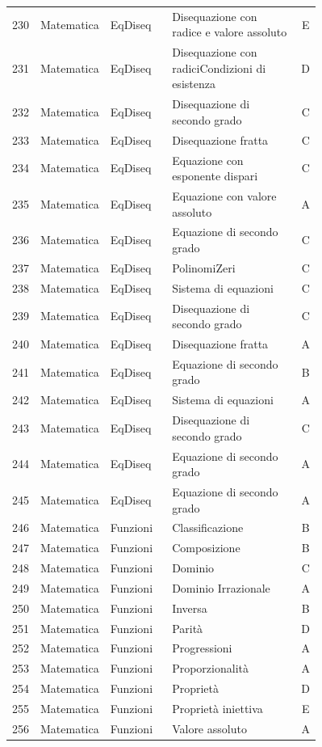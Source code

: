 \documentclass[20pt, a4paper]{article}
\begin{document}
\begin{longtable}{@{}r>{\raggedright\arraybackslash}p{0.14\linewidth}>{\raggedright\arraybackslash}p{0.20\linewidth}>{\raggedright\arraybackslash}p{0.42\linewidth}c@{}}
230 & Matematica & EqDiseq & Disequazione con radice e valore assoluto & E \\
231 & Matematica & EqDiseq & Disequazione con radiciCondizioni di esistenza & D \\
232 & Matematica & EqDiseq & Disequazione di secondo grado & C \\
233 & Matematica & EqDiseq & Disequazione fratta & C \\
234 & Matematica & EqDiseq & Equazione con esponente dispari & C \\
235 & Matematica & EqDiseq & Equazione con valore assoluto & A \\
236 & Matematica & EqDiseq & Equazione di secondo grado & C \\
237 & Matematica & EqDiseq & PolinomiZeri & C \\
238 & Matematica & EqDiseq & Sistema di equazioni & C \\
239 & Matematica & EqDiseq & Disequazione di secondo grado & C \\
240 & Matematica & EqDiseq & Disequazione fratta & A \\
241 & Matematica & EqDiseq & Equazione di secondo grado & B \\
242 & Matematica & EqDiseq & Sistema di equazioni & A \\
243 & Matematica & EqDiseq & Disequazione di secondo grado & C \\
244 & Matematica & EqDiseq & Equazione di secondo grado & A \\
245 & Matematica & EqDiseq & Equazione di secondo grado & A \\
246 & Matematica & Funzioni & Classificazione & B \\
247 & Matematica & Funzioni & Composizione & B \\
248 & Matematica & Funzioni & Dominio & C \\
249 & Matematica & Funzioni & Dominio Irrazionale & A \\
250 & Matematica & Funzioni & Inversa & B \\
251 & Matematica & Funzioni & Parità & D \\
252 & Matematica & Funzioni & Progressioni & A \\
253 & Matematica & Funzioni & Proporzionalità & A \\
254 & Matematica & Funzioni & Proprietà & D \\
255 & Matematica & Funzioni & Proprietà iniettiva & E \\
256 & Matematica & Funzioni & Valore assoluto & A \\

\end{longtable}
\end{document}
